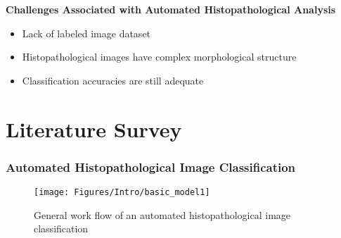 \documentclass [9pt,times] {beamer}
\begin{document}
\begin{frame}
\fontsize{5pt}{7pt}\selectfont
	\begin{block}{\textbf{Challenges Associated with Automated  Histopathological Analysis \cite{gurcan2009, Ong1996}}}
		\begin{block}{}
				\begin{itemize}
						\fontsize{6pt}{8pt}\selectfont
						\item Lack of labeled image dataset  \\[.20cm]
						\item Histopathological images have complex morphological structure \\[.20cm]
						\item Classification accuracies are still adequate
				\end{itemize}
	\end{block}
	\end{block}



\end{frame}


\section{Literature Survey}

\begin{frame}\frametitle{Automated Histopathological Image Classification}

\begin{figure}
	\centering
	\texttt{[image: Figures/Intro/basic\_model1]}
	\caption{General work flow of an automated histopathological image classification}
	\label{fig:ac}
\end{figure}

\end{frame}
\end{document}
